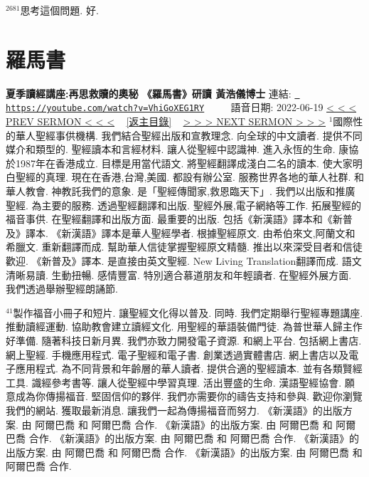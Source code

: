 \documentclass{book}
\begin{document}
$^{2681}$思考這個問題.
好.
\newpage



\section{羅馬書}
\label{sec:VhiGoXEG1RY}
\textbf{夏季讀經講座:再思救贖的奧秘 《羅馬書》研讀 黃浩儀博士}
\newline
\newline
連結: \href{https://youtube.com/watch?v=VhiGoXEG1RY}{\texttt{ https://youtube.com/watch?v=VhiGoXEG1RY}} ~~~~ 語音日期: 2022-06-19 
\newline
\newline
\hyperref[sec:7tQS0En6sh8]{\small{< < < PREV SERMON < < <}}
~
\hyperref[sec:index]{\small{[返主目錄]}}
~
\hyperref[sec:A_3yEYQkm9Y]{\small{> > > NEXT SERMON > > >}}
\newline
\newline
$^{1}$國際性的華人聖經事供機構.
我們結合聖經出版和宣教理念.
向全球的中文讀者.
提供不同媒介和類型的.
聖經讀本和言經材料.
讓人從聖經中認識神.
進入永恆的生命.
康協於1987年在香港成立.
目標是用當代語文.
將聖經翻譯成淺白二名的讀本.
使大家明白聖經的真理.
現在在香港,台灣,美國.
都設有辦公室.
服務世界各地的華人社群.
和華人教會.
神教託我們的意象.
是「聖經傳聞家,救恩臨天下」.
我們以出版和推廣聖經.
為主要的服務.
透過聖經翻譯和出版.
聖經外展,電子網絡等工作.
拓展聖經的福音事供.
在聖經翻譯和出版方面.
最重要的出版.
包括《新漢語》譯本和《新普及》譯本.
《新漢語》譯本是華人聖經學者.
根據聖經原文.
由希伯來文,阿蘭文和希臘文.
重新翻譯而成.
幫助華人信徒掌握聖經原文精髓.
推出以來深受目者和信徒歡迎.
《新普及》譯本.
是直接由英文聖經.
New Living Translation翻譯而成.
語文清晰易讀.
生動扭暢.
感情豐富.
特別適合慕道朋友和年輕讀者.
在聖經外展方面.
我們透過舉辦聖經朗誦節.

$^{41}$製作福音小冊子和短片.
讓聖經文化得以普及.
同時.
我們定期舉行聖經專題講座.
推動讀經運動.
協助教會建立讀經文化.
用聖經的華語裝備門徒.
為普世華人歸主作好準備.
隨著科技日新月異.
我們亦致力開發電子資源.
和網上平台.
包括網上書店.
網上聖經.
手機應用程式.
電子聖經和電子書.
創業透過實體書店.
網上書店以及電子應用程式.
為不同背景和年齡層的華人讀者.
提供合適的聖經讀本.
並有各類賢經工具.
識經參考書等.
讓人從聖經中學習真理.
活出豐盛的生命.
漢語聖經協會.
願意成為你傳揚福音.
堅固信仰的夥伴.
我們亦需要你的禱告支持和參與.
歡迎你瀏覽我們的網站.
獲取最新消息.
讓我們一起為傳揚福音而努力.
《新漢語》的出版方案.
由 阿爾巴喬 和 阿爾巴喬 合作.
《新漢語》的出版方案.
由 阿爾巴喬 和 阿爾巴喬 合作.
《新漢語》的出版方案.
由 阿爾巴喬 和 阿爾巴喬 合作.
《新漢語》的出版方案.
由 阿爾巴喬 和 阿爾巴喬 合作.
《新漢語》的出版方案.
由 阿爾巴喬 和 阿爾巴喬 合作.
\end{document}
